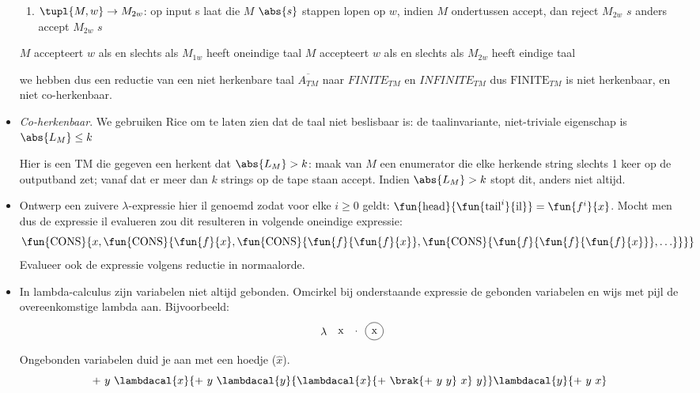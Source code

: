 \documentclass[fleqn]{article}
\newcommand{\cons}{\mbox{CONS}}
\begin{document}
\begin{answer}
\begin{itemize}
\begin{enumerate}
\item $\tupl{M,w}\rightarrow M_{2w}$: op input s laat die $M$ $\abs{s}$ stappen lopen op $w$,
                     indien $M$ ondertussen accept, dan reject $M_{2w}$ $s$
		     	                          anders accept $M_{2w}$ $s$
\end{enumerate}
$M$ accepteert $w$ als en slechts als $M_{1w}$ heeft oneindige taal
$M$ accepteert $w$ als en slechts als $M_{2w}$ heeft eindige taal

we hebben dus een reductie van een niet herkenbare taal
$\overline{A_{TM}}$ naar $FINITE_{TM}$ en $INFINITE_{TM}$ dus $\mbox{FINITE}_{TM}$ is niet herkenbaar, en niet co-herkenbaar.



\item \textit{Co-herkenbaar}. We gebruiken Rice om te laten zien dat de taal niet beslisbaar is:
de taalinvariante, niet-triviale eigenschap is {\em $\abs{L_M} \leq k$ }

Hier is een TM die gegeven een herkent dat $\abs{L_M} > k$:
maak van $M$ een enumerator die elke herkende string slechts 1 keer op
de outputband zet; vanaf dat er meer dan $k$ strings op de tape staan
accept. Indien $\abs{L_M} > k$ stopt dit, anders niet altijd.
\end{itemize}
\end{answer}
\begin{question}
\begin{itemize}
 \item Ontwerp een zuivere $\lambda$-expressie hier $\mbox{il}$ genoemd zodat voor elke $i\geq 0$ geldt: $\fun{\mbox{head}}{\fun{\mbox{tail}^i}{\mbox{il}}}=\fun{f^i}{x}$. Mocht men dus de expressie $\mbox{il}$ evalueren zou dit resulteren in volgende oneindige expressie:
 \begin{equation}
  \fun{\cons}{x,\fun{\cons}{ \fun{f}{x}, \fun{\cons}{ \fun{f}{\fun{f}{x}}, \fun{\cons}{ \fun{f}{\fun{f}{\fun{f}{x}}} , \ldots } } }}
 \end{equation}
 Evalueer ook de expressie  volgens reductie in normaalorde.
 \item In lambda-calculus zijn variabelen niet altijd gebonden. Omcirkel bij onderstaande expressie de gebonden variabelen en wijs met pijl de overeenkomstige lambda aan. Bijvoorbeeld:
 \[
 \tikz[baseline]{\node(l){$\lambda$};}\ \tikz[baseline]{\node(y){x};}\ \tikz[baseline]{\node(x){.};}\ \tikz[baseline]{\node[draw,circle](x){x};}
 \]
 Ongebonden variabelen duid je aan met een hoedje ($\hat{x}$).
 \begin{equation}
  +\ y\ \lambdacal{x}{+\ y\ \lambdacal{y}{\lambdacal{x}{+\ \brak{+\ y\ y}\ x}\ y}}\lambdacal{y}{+\ y\ x}
 \end{equation}
\end{itemize}
\end{question}
\end{document}
